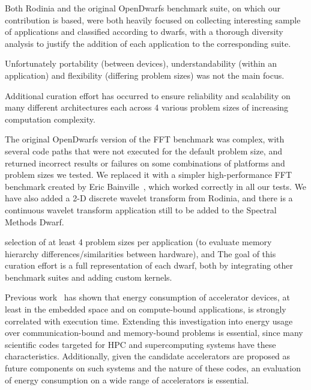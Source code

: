 \documentclass[../document.tex]{subfiles}
\begin{document}
\label{sec:extending_the_opendwarfs_benchmark_suite}

Both Rodinia and the original OpenDwarfs benchmark suite, on which our contribution is based, were both heavily focused on collecting interesting sample of applications and classified according to dwarfs, with a thorough diversity analysis to justify the addition of each application to the corresponding suite.

Unfortunately portability (between devices), understandability (within an application) and flexibility (differing problem sizes) was not the main focus.

Additional curation effort has occurred to ensure reliability and scalability on many different architectures each across 4 various problem sizes of increasing computation complexity.

The original OpenDwarfs version of the FFT benchmark was complex, with several code paths that were not executed for the default problem size, and returned incorrect results or failures on some combinations of platforms and problem sizes we tested.
We replaced it with a simpler high-performance FFT benchmark created by Eric Bainville~\cite{bainville2010fft}, which worked correctly in all our tests.
We have also added a 2-D discrete wavelet transform from Rodinia, and there is a continuous wavelet transform application still to be added to the Spectral Methods Dwarf.

selection of at least 4 problem sizes per application (to evaluate memory hierarchy differences/similarities between hardware), and
The goal of this curation effort is a full representation of each dwarf, both by integrating other benchmark suites and adding custom kernels.

Previous work~\cite{johnston2017embedded} has shown that energy consumption of accelerator devices, at least in the embedded space and on compute-bound applications, is strongly correlated with execution time.
Extending this investigation into energy usage over communication-bound and memory-bound problems is essential, since many scientific codes targeted for HPC and supercomputing systems have these characteristics.
Additionally, given the candidate accelerators are proposed as future components on such systems and the nature of these codes, an evaluation of energy consumption on a wide range of accelerators is essential.
\end{document}
